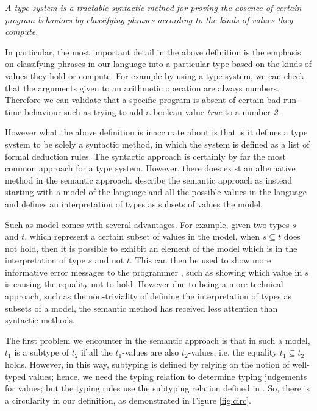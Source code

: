 \documentclass{l4proj}
\begin{document}
\emph{A type system is a tractable syntactic method for proving the absence of certain program behaviors by classifying phrases according to the kinds of values they compute.}

In particular, the most important detail in the above definition is the emphasis on classifying phrases in our language into a particular type based on the kinds of values they hold or compute.
For example by using a type system, we can check that the arguments given to an arithmetic operation are always numbers.
Therefore we can validate that a specific program is absent of certain bad run-time behaviour such as trying to add a boolean value \emph{true} to a number \emph{2}.

However what the above definition is inaccurate about is that is it defines a type system to be solely a syntactic method, in which the system is defined as a list of formal deduction rules.
The syntactic approach is certainly by far the most common approach for a type system.
However, there does exist an alternative method in the semantic approach.
\citet{Frisch2002} describe the semantic approach as instead starting with a model of the language and all the possible values in the language and defines an interpretation of types as subsets of values the model.

Such as model comes with several advantages.
For example, given two types $s$ and $t$, which represent a certain subset of values in the model, when $s \subseteq t$ does not hold, then it is possible to exhibit an element of the model which is in the interpretation of type $s$ and not $t$.
This can then be used to show more informative error messages to the programmer \citep{Castagna2005}, such as showing which value in $s$ is causing the equality not to hold.
However due to being a more technical approach, such as the non-triviality of defining the interpretation of types as subsets of a model, the semantic method has received less attention than syntactic methods.

The first problem we encounter in the semantic approach is that in such a model, $t_{1}$ is a subtype of $t_{2}$ if all the $t_{1}$-values are also $t_{2}$-values, i.e. the equality $t_{1} \subseteq t_{2}$ holds.
However, in this way, subtyping is defined by relying on the notion of well-typed values; hence, we need the typing relation to determine typing judgements for values; but the typing rules use the subtyping relation defined in \citep{Dardha2017}.
So, there is a circularity in our definition, as demonstrated in Figure \ref{fig:circ}.
\end{document}
